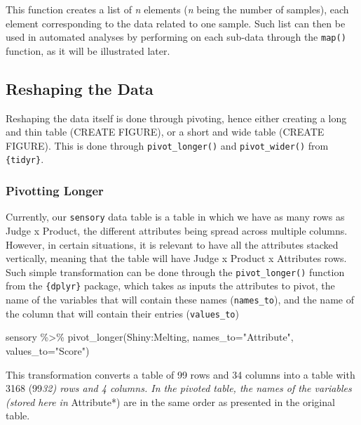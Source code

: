 \documentclass[
]{book}
\newenvironment{Shaded}{\begin{snugshade}}{\end{snugshade}}
\newcommand{\AttributeTok}[1]{\textcolor[rgb]{0.77,0.63,0.00}{#1}}
\newcommand{\FunctionTok}[1]{\textcolor[rgb]{0.00,0.00,0.00}{#1}}
\newcommand{\NormalTok}[1]{#1}
\newcommand{\SpecialCharTok}[1]{\textcolor[rgb]{0.00,0.00,0.00}{#1}}
\newcommand{\StringTok}[1]{\textcolor[rgb]{0.31,0.60,0.02}{#1}}
\begin{document}
This function creates a list of \emph{n} elements (\emph{n} being the number of samples), each element corresponding to the data related to one sample. Such list can then be used in automated analyses by performing on each sub-data through the \texttt{map()} function, as it will be illustrated later.

\hypertarget{reshaping-the-data}{%
\subsection{Reshaping the Data}\label{reshaping-the-data}}

Reshaping the data itself is done through pivoting, hence either creating a long and thin table (CREATE FIGURE), or a short and wide table (CREATE FIGURE). This is done through \texttt{pivot\_longer()} and \texttt{pivot\_wider()} from \texttt{\{tidyr\}}.

\hypertarget{pivotting-longer}{%
\subsubsection{Pivotting Longer}\label{pivotting-longer}}

Currently, our \texttt{sensory} data table is a table in which we have as many rows as Judge x Product, the different attributes being spread across multiple columns. However, in certain situations, it is relevant to have all the attributes stacked vertically, meaning that the table will have Judge x Product x Attributes rows. Such simple transformation can be done through the \texttt{pivot\_longer()} function from the \texttt{\{dplyr\}} package, which takes as inputs the attributes to pivot, the name of the variables that will contain these names (\texttt{names\_to}), and the name of the column that will contain their entries (\texttt{values\_to})

\begin{Shaded}
\begin{Highlighting}[]
\NormalTok{sensory }\SpecialCharTok{\%\textgreater{}\%} 
  \FunctionTok{pivot\_longer}\NormalTok{(Shiny}\SpecialCharTok{:}\NormalTok{Melting, }\AttributeTok{names\_to=}\StringTok{"Attribute"}\NormalTok{, }\AttributeTok{values\_to=}\StringTok{"Score"}\NormalTok{)}
\end{Highlighting}
\end{Shaded}

This transformation converts a table of 99 rows and 34 columns into a table with 3168 (99\emph{32) rows and 4 columns.
In the pivoted table, the names of the variables (stored here in }Attribute*) are in the same order as presented in the original table.
\end{document}
